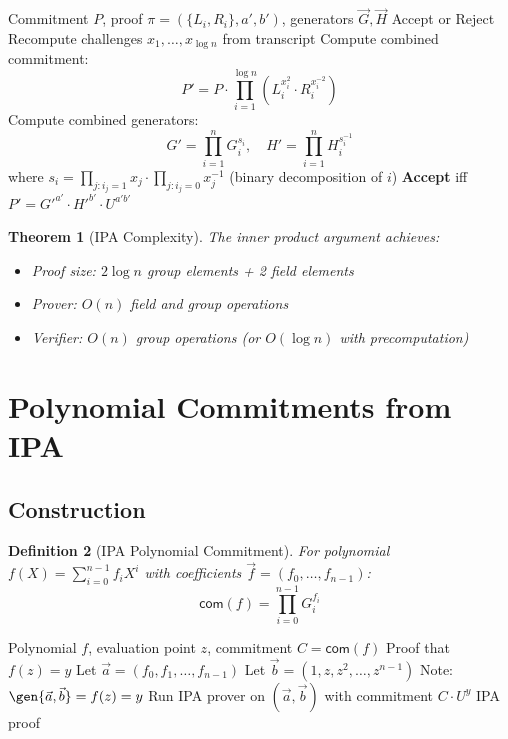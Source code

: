 \documentclass[11pt,a4paper]{article}
\newtheorem{theorem}{Theorem}[section]
\newtheorem{definition}[theorem]{Definition}
\newcommand{\com}{\mathsf{com}}
\begin{document}
\begin{algorithm}
\caption{Inner Product Argument (Verifier)}
\label{alg:ipa-verifier}
\begin{algorithmic}[1]
\Require Commitment $P$, proof $\pi = (\{L_i, R_i\}, a', b')$, generators $\vec{G}, \vec{H}$
\Ensure Accept or Reject
\State Recompute challenges $x_1, \ldots, x_{\log n}$ from transcript
\State Compute combined commitment:
\[
P' = P \cdot \prod_{i=1}^{\log n} (L_i^{x_i^2} \cdot R_i^{x_i^{-2}})
\]
\State Compute combined generators:
\[
G' = \prod_{i=1}^n G_i^{s_i}, \quad H' = \prod_{i=1}^n H_i^{s_i^{-1}}
\]
where $s_i = \prod_{j: i_j = 1} x_j \cdot \prod_{j: i_j = 0} x_j^{-1}$ (binary decomposition of $i$)
\State \textbf{Accept} iff $P' = G'^{a'} \cdot H'^{b'} \cdot U^{a'b'}$
\end{algorithmic}
\end{algorithm}

\begin{theorem}[IPA Complexity]
The inner product argument achieves:
\begin{itemize}
    \item Proof size: $2\log n$ group elements + 2 field elements
    \item Prover: $O(n)$ field and group operations
    \item Verifier: $O(n)$ group operations (or $O(\log n)$ with precomputation)
\end{itemize}
\end{theorem}

\section{Polynomial Commitments from IPA}
\label{sec:commitment}

\subsection{Construction}

\begin{definition}[IPA Polynomial Commitment]
For polynomial $f(X) = \sum_{i=0}^{n-1} f_i X^i$ with coefficients $\vec{f} = (f_0, \ldots, f_{n-1})$:
\[
\com(f) = \prod_{i=0}^{n-1} G_i^{f_i}
\]
\end{definition}

\begin{algorithm}
\caption{Polynomial Evaluation Proof}
\label{alg:poly-eval}
\begin{algorithmic}[1]
\Require Polynomial $f$, evaluation point $z$, commitment $C = \com(f)$
\Ensure Proof that $f(z) = y$
\State Let $\vec{a} = (f_0, f_1, \ldots, f_{n-1})$ 
\State Let $\vec{b} = (1, z, z^2, \ldots, z^{n-1})$ 
\State Note: $\gen{\vec{a}, \vec{b}} = f(z) = y$
\State Run IPA prover on $(\vec{a}, \vec{b})$ with commitment $C \cdot U^y$
\State \Return IPA proof
\end{algorithmic}
\end{algorithm}
\end{document}
